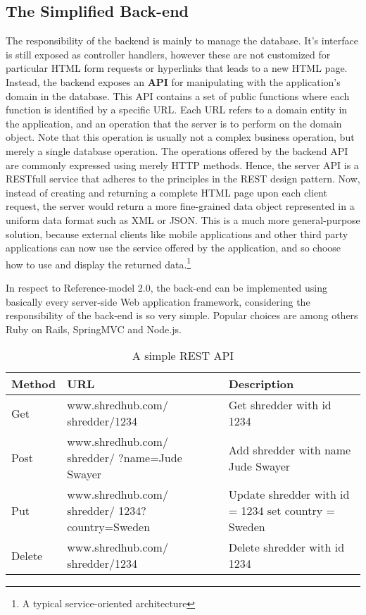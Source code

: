 \subsection{The Simplified Back-end}
The responsibility of the backend is mainly to manage the database. It's interface is still exposed as controller handlers, however these are not customized for particular HTML form requests or hyperlinks that leads to a new HTML page. Instead, the backend exposes an \textbf{API} for manipulating with the application's domain in the database. This API contains a set of public functions where each function is identified by a specific URL. Each URL refers to a domain entity in the application, and an operation that the server is to perform on the domain object. Note that this operation is usually not a complex business operation, but merely a single database operation. The operations offered by the backend API are commonly expressed using merely HTTP methods. Hence, the server API is a RESTfull service that adheres to the principles in the REST design pattern. Now, instead of creating and returning a complete HTML page upon each client request, the server would return a more fine-grained data object represented in a uniform data format such as XML or JSON. This is a much more general-purpose solution, because external clients like mobile applications and other third party applications can now use the service offered by the application, and so choose how to use and display the returned data.\footnote{A typical service-oriented architecture}

In respect to Reference-model 2.0, the back-end can be implemented using basically every server-side Web application framework, considering the responsibility of the back-end is so very simple. Popular choices are among others Ruby on Rails, SpringMVC and Node.js\cite{popFrameworks}.

\begin{table}
	\centering
	\begin{tabularx}
	{\linewidth}{ |X|X|X| }
	    \hline
	    \textbf{Method} & \textbf{URL}  & \textbf{Description} \\ \hline
	    Get & www.shredhub.com/ shredder/1234 & Get shredder with id 1234 \\ \hline
	    Post & www.shredhub.com/ shredder/ ?name=Jude Swayer & Add shredder with name Jude Swayer  \\ \hline
	    Put & www.shredhub.com/ shredder/ 1234?country=Sweden & Update shredder with id = 1234 set country = Sweden \\ \hline
	    Delete & www.shredhub.com/ shredder/1234 & Delete shredder with id 1234 \\ \hline
	    \end{tabularx}
	    \caption{A simple REST API}
	    \label{table:urls}
	   \end{table}
	   
